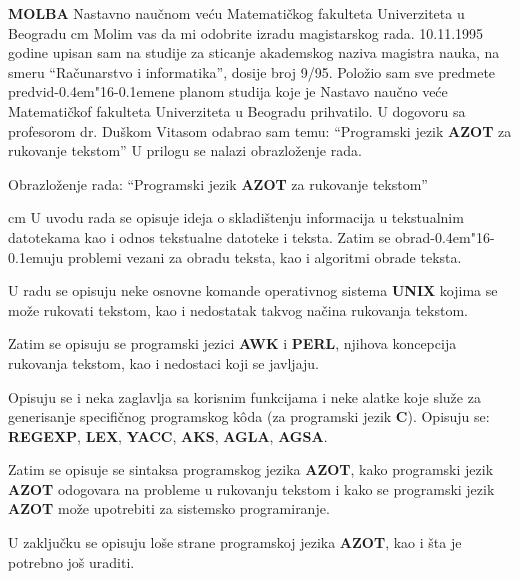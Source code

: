 \documentclass[12pt,a4paper]{article}
\def\d{d\kern-0.4em\char"16\kern-0.1em}
\begin{document}
  \parindent0pt
  {
    \Large{\bf MOLBA}
    \vskip 1cm
    Nastavno nau\v cnom ve\'cu Matemati\v ckog fakulteta
    \vskip 2mm
    Univerziteta u Beogradu
  }
   cm
  Molim vas da mi odobrite izradu magistarskog rada.
  \vskip 5mm
  10.11.1995 godine upisan sam na studije za sticanje akademskog naziva
  magi\-stra nauka, na smeru ``Ra\v cunarstvo i informatika'', dosije broj
  9/95.
  \vskip 5mm
  Polo\v zio sam sve predmete predvi\d ene planom studija koje je Nastavo
  nau\v cno ve\'ce Matemati\v ckof fakulteta Univerziteta u Beogradu
  prihvatilo.
  \vskip 5mm
  U dogovoru sa profesorom dr. Du\v skom Vitasom odabrao sam temu:
  ``Programski jezik {\bf AZOT} za rukovanje tekstom''
  \vskip 5mm
  U prilogu se nalazi obrazlo\v zenje rada.
  \vskip 3cm

  \newpage

  \begin{center}
    \Large Obrazlo\v zenje rada:
    \vskip 2mm
    ``Programski jezik {\bf AZOT} za rukovanje tekstom''
  \end{center}
   cm
  U uvodu rada se opisuje ideja o skladi\v stenju informacija u tekstualnim
  datotekama kao i odnos tekstualne datoteke i teksta. Zatim se obra\d uju
  pro\-blemi vezani za obradu teksta, kao i algoritmi obrade teksta.

  U radu se opisuju neke osnovne komande operativnog sistema {\bf UNIX}
  kojima se mo\v ze rukovati tekstom, kao i nedostatak takvog na\v cina
  rukovanja tekstom.

  Zatim se opisuju se programski jezici {\bf AWK} i {\bf PERL}, njihova
  koncepcija rukovanja tekstom, kao i nedostaci koji se javljaju.

  Opisuju se i neka zaglavlja sa korisnim funkcijama i neke alatke koje
  slu\v ze za generisanje specifi\v cnog programskog k\^oda (za programski
  jezik {\bf C}). Opisuju se: {\bf REGEXP}, {\bf LEX}, {\bf YACC},
  {\bf AKS}, {\bf AGLA}, {\bf AGSA}.

  Zatim se opisuje se sintaksa programskog jezika {\bf AZOT}, kako
  programski jezik {\bf AZOT} odogovara na probleme u rukovanju tekstom i
  kako se programski jezik {\bf AZOT} mo\v ze upotrebiti za sistemsko
  programiranje.

  U zaklju\v cku se opisuju lo\v se strane programskoj jezika {\bf AZOT},
  kao i \v sta je potrebno jo\v s uraditi.
  \vskip 5mm
\end{document}
